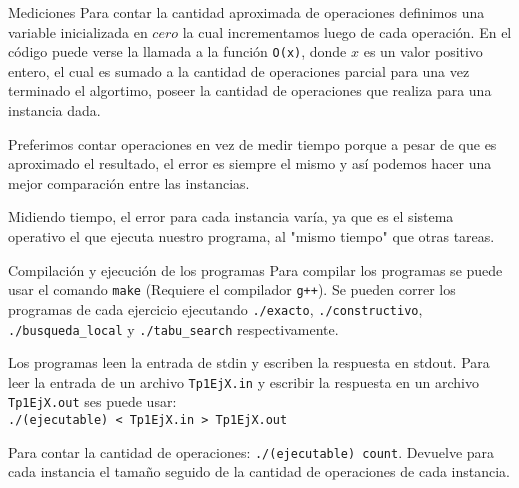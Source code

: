 \documentclass[12pt,titlepage]{article}
\begin{document}
	\begin{section}{Mediciones}
		Para contar la cantidad aproximada de operaciones definimos una variable inicializada en $cero$ la cual incrementamos luego de cada operación. En el código puede verse la llamada a la función \texttt{O(x)}, donde $x$ es un valor positivo entero, el cual es sumado a la cantidad de operaciones parcial para una vez terminado el algortimo, poseer la cantidad de operaciones que realiza para una instancia dada.
			
		Preferimos contar operaciones en vez de medir tiempo porque a pesar de que es aproximado el resultado, el error es siempre el mismo y así podemos hacer una mejor comparación entre las instancias.
			
		Midiendo tiempo, el error para cada instancia varía, ya que es el sistema operativo el que ejecuta nuestro programa, al "mismo tiempo" que otras tareas.
	\end{section}
	\begin{section}{Compilación y ejecución de los programas}
	Para compilar los programas se puede usar el comando \texttt{make} (Requiere el compilador \texttt{g++}).
	Se pueden correr los programas de cada ejercicio ejecutando \texttt{./exacto}, \texttt{./constructivo}, \texttt{./busqueda\_local} y \texttt{./tabu\_search} respectivamente.
		
	Los programas leen la entrada de stdin y escriben la respuesta en stdout. Para leer la entrada de un archivo \texttt{Tp1EjX.in} y escribir la respuesta en un archivo \texttt{Tp1EjX.out} ses puede usar:\\ \texttt{./(ejecutable) < Tp1EjX.in > Tp1EjX.out}

	Para contar la cantidad de operaciones: \texttt{./(ejecutable) count}. Devuelve para cada instancia el tamaño seguido de la cantidad de operaciones de cada instancia.
	\end{section}
\end{document}
